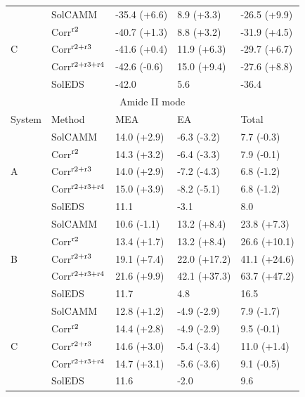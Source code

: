 \documentclass[a4paper,titlepage,twoside,fleqn,12pt]{book}
\begin{document}
\begin{appendices}
\begin{table}[ht]
\begin{tabular*}{1.0\textwidth}{@{\extracolsep{\fill} } l ll ll}
\hline
\multirow{5}{*}{C}   & SolCAMM   & -35.4 (+6.6)  & 8.9 (+3.3) & -26.5 (+9.9) \\
        & Corr$^{\rm r2}$        & -40.7 (+1.3)  & 8.8 (+3.2) & -31.9 (+4.5) \\
        & Corr$^{\rm r2+r3}$     & -41.6 (+0.4)  &11.9 (+6.3) & -29.7 (+6.7) \\
        & Corr$^{\rm r2+r3+r4}$  & -42.6 (-0.6)  &15.0 (+9.4) & -27.6 (+8.8) \\
                     & SolEDS    & -42.0         & 5.6        & -36.4        \\
\hline\hline
\multicolumn{5}{c}{Amide II mode} \\
\hline
System               & Method    & MEA           & EA         & Total        \\
\hline
\multirow{5}{*}{A}   & SolCAMM   & 14.0 (+2.9)   & -6.3 (-3.2)& 7.7 (-0.3)   \\
        & Corr$^{\rm r2}$        & 14.3 (+3.2)   & -6.4 (-3.3)& 7.9 (-0.1)   \\
        & Corr$^{\rm r2+r3}$     & 14.0 (+2.9)   & -7.2 (-4.3)& 6.8 (-1.2)   \\
        & Corr$^{\rm r2+r3+r4}$  & 15.0 (+3.9)   & -8.2 (-5.1)& 6.8 (-1.2)   \\
                     & SolEDS    & 11.1          & -3.1       & 8.0          \\
\hline
\multirow{5}{*}{B}   & SolCAMM   & 10.6 (-1.1)   & 13.2 (+8.4)& 23.8 (+7.3)  \\
        & Corr$^{\rm r2}$        & 13.4 (+1.7)   & 13.2 (+8.4)& 26.6 (+10.1) \\
        & Corr$^{\rm r2+r3}$     & 19.1 (+7.4)   & 22.0 (+17.2)&41.1 (+24.6) \\
        & Corr$^{\rm r2+r3+r4}$  & 21.6 (+9.9)   & 42.1 (+37.3)&63.7 (+47.2) \\
                     & SolEDS    & 11.7          & 4.8        & 16.5         \\
\hline
\multirow{5}{*}{C}   & SolCAMM   & 12.8 (+1.2)   & -4.9 (-2.9)& 7.9 (-1.7)   \\
        & Corr$^{\rm r2}$        & 14.4 (+2.8)   & -4.9 (-2.9)& 9.5 (-0.1)   \\
        & Corr$^{\rm r2+r3}$     & 14.6 (+3.0)   & -5.4 (-3.4)&11.0 (+1.4)   \\
        & Corr$^{\rm r2+r3+r4}$  & 14.7 (+3.1)   & -5.6 (-3.6)& 9.1 (-0.5)   \\
                     & SolEDS    & 11.6          & -2.0       & 9.6          \\
\hline\hline
\end{tabular*}
\end{table}


\end{appendices}
\end{document}
